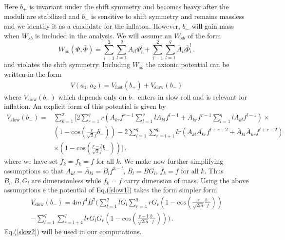 \documentclass[12pt]{article}
\begin{document}
Here $b_+$ is invariant under the shift symmetry and becomes heavy after the moduli are stabilized and $b_-$ is sensitive
to shift symmetry and remains massless and we identify it as a candidate for the inflaton. However, $b_-$ will gain mass
when $W_{sb}$ is included in the analysis. We will assume an $W_{sb}$ of the form
\begin{equation}
  W_{sb} \left( \Phi,\bar \Phi \right) =
  \sum_{i= 1}^{2} \sum_{l = 1}^{q} {A}_{i l} {\Phi}_{i}^{l} + \sum_{i = 1}^{2} \sum_{l = 1}^{q} {\bar{A}}_{i l} {\bar{\Phi}}_{i}^{l}\,.
  \label{wsn1}
\end{equation}
and violates the shift symmetry. Including $W_{sb}$ the axionic potential can be written in the form
\begin{align}
  V(a_1,a_2) = V_{\text{fast}}(b_+) + V_{\text{slow}}(b_-)
\end{align}
where $V_{\text{slow}}(b_-)$ which depends only on $b_-$ enters in slow roll and is relevant for inflation.
An explicit form of this potential is given by
\begin{align}
  {V}_{\text{slow}} (b_-) = & \sum_{k = 1}^{2} \Big[ 2 \sum_{r = 1}^{q} r \left( {A}_{k r} {f}^{r - 1} \sum_{l = 1}^{q} l {A}_{k l} {f}^{l - 1} + {\overline{A}}_{k r} {{f}}^{r - 1} \sum_{l = 1}^{q} l \overline{{A}}_{k l} {{f}}^{l - 1} \right) \times \nonumber\\
                            & \left( 1 - \text{cos} \left( \frac{r}{ \sqrt 2 f}
    {b}_{-}\right) \right)
    - 2 \sum_{l = 1}^{q} \sum_{r = l + 1}^{q} l r \left( {A}_{k l} {A}_{k r} {f}^{l + r - 2} + {\overline{A}}_{k l} {\overline{A}}_{k r} {{f}}^{l + r - 2} \right)\nonumber\\
                            & \times \left( 1 - \text{cos} \left( \frac{r - l}{\sqrt 2 f } {b}_{-}\right) \right) \Big]\,.
  \label{slow1}
\end{align}
where we have set $\bar f_k=f_k=f$ for all $k$.
We make now further simplifying assumptions so that
${A}_{k l} = {\overline{A}}_{k l} = {B}_{l} {f}^{3 - l}$, ${B}_{l} = B {G}_{l}$, ${f}_{k} = f$ for all $k$. Thus $B_l, B, G_l$ are dimensionless while $f_k=f$ carry dimension of mass. Using the above assumptions
e the potential of Eq.(\ref{slow1}) takes the form simpler form
\begin{equation}
  \begin{aligned}
    {V}_{\text{slow}} \left( {b}_{-} \right) =
    4 m {f}^{4} {B}^{2} \Big( \sum_{l = 1}^{q} l {G}_{l} \sum_{r = 4}^{q} r {G}_{r} \left( 1 - \text{cos} \left( \frac{r}{\sqrt{2 m}} \frac{{b}_{-}}{f} \right) \right) \\
    - \sum_{l = 1}^{q} \sum_{r = l + 4}^{q} l r {G}_{l} {G}_{r} \left( 1 - \text{cos} \left( \frac{r - l}{\sqrt{2 m}} \frac{{b}_{-}}{f} \right) \right) \Big)\,.
    \label{slow2}
  \end{aligned}
\end{equation}
Eq.(\ref{slow2}) will be used in our computations.\\
\end{document}
